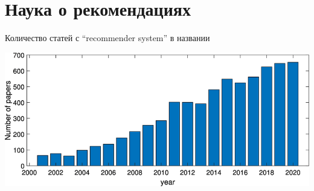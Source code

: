 \documentclass[11pt,aspectratio=169]{beamer}
\begin{document}
\section{Наука о рекомендациях}

{
\begin{frame}[plain]
\end{frame}
}

\begin{frame}{Количество статей с ``recommender system'' в названии}
\begin{center}
\includegraphics[scale=1.5]{images/publications.png}
\end{center}
\end{frame}
\end{document}

